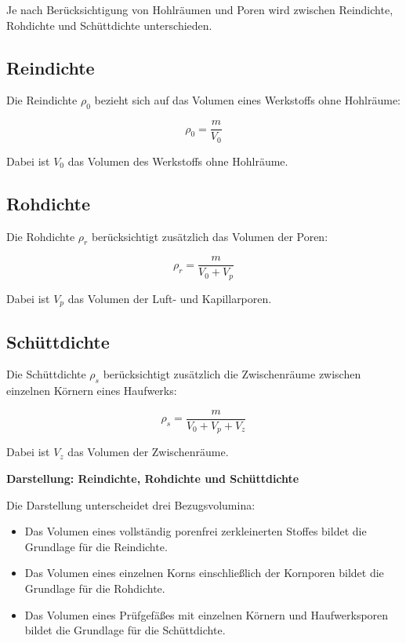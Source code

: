 \documentclass[
  12pt,
  a4paper,
  oneside
]{scrreprt}
\begin{document}
Je nach Berücksichtigung von Hohlräumen und Poren wird zwischen
Reindichte, Rohdichte und Schüttdichte unterschieden.


\subsection{Reindichte}

Die Reindichte $\rho_0$ bezieht sich auf das Volumen eines Werkstoffs
ohne Hohlräume:

\begin{equation}
  \rho_0 = \frac{m}{V_0}
\end{equation}

Dabei ist $V_0$ das Volumen des Werkstoffs ohne Hohlräume.


\subsection{Rohdichte}

Die Rohdichte $\rho_r$ berücksichtigt zusätzlich das Volumen der Poren:

\begin{equation}
  \rho_r = \frac{m}{V_0 + V_p}
\end{equation}

Dabei ist $V_p$ das Volumen der Luft- und Kapillarporen.


\subsection{Schüttdichte}

Die Schüttdichte $\rho_s$ berücksichtigt zusätzlich die Zwischenräume
zwischen einzelnen Körnern eines Haufwerks:

\begin{equation}
  \rho_s = \frac{m}{V_0 + V_p + V_z}
\end{equation}

Dabei ist $V_z$ das Volumen der Zwischenräume.


\begin{darstellungsbox}
\textbf{Darstellung: Reindichte, Rohdichte und Schüttdichte}

Die Darstellung unterscheidet drei Bezugsvolumina:

\begin{itemize}
  \item Das Volumen eines vollständig porenfrei zerkleinerten Stoffes
  bildet die Grundlage für die Reindichte.

  \item Das Volumen eines einzelnen Korns einschließlich der Kornporen
  bildet die Grundlage für die Rohdichte.

  \item Das Volumen eines Prüfgefäßes mit einzelnen Körnern und
  Haufwerksporen bildet die Grundlage für die Schüttdichte.
\end{itemize}
\end{darstellungsbox}
\end{document}
